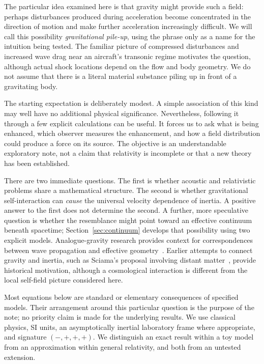 \documentclass[11pt,a4paper]{article}
\numberwithin{equation}{section}
\begin{document}
The particular idea examined here is that gravity might provide such a field: perhaps disturbances produced during acceleration become concentrated in the direction of motion and make further acceleration increasingly difficult. We will call this possibility \emph{gravitational pile-up}, using the phrase only as a name for the intuition being tested. The familiar picture of compressed disturbances and increased wave drag near an aircraft's transonic regime motivates the question, although actual shock locations depend on the flow and body geometry. We do not assume that there is a literal material substance piling up in front of a gravitating body.

The starting expectation is deliberately modest. A simple association of this kind may well have no additional physical significance. Nevertheless, following it through a few explicit calculations can be useful. It forces us to ask what is being enhanced, which observer measures the enhancement, and how a field distribution could produce a force on its source. The objective is an understandable exploratory note, not a claim that relativity is incomplete or that a new theory has been established.

There are two immediate questions. The first is whether acoustic and relativistic problems share a mathematical structure. The second is whether gravitational self-interaction can \emph{cause} the universal velocity dependence of inertia. A positive answer to the first does not determine the second. A further, more speculative question is whether the resemblance might point toward an effective continuum beneath spacetime; Section~\ref{sec:continuum} develops that possibility using two explicit models. Analogue-gravity research provides context for correspondences between wave propagation and effective geometry~\cite{barcelo}. Earlier attempts to connect gravity and inertia, such as Sciama's proposal involving distant matter~\cite{sciama}, provide historical motivation, although a cosmological interaction is different from the local self-field picture considered here.

Most equations below are standard or elementary consequences of specified models. Their arrangement around this particular question is the purpose of the note; no priority claim is made for the underlying results. We use classical physics, SI units, an asymptotically inertial laboratory frame where appropriate, and signature $(-,+,+,+)$. We distinguish an exact result within a toy model from an approximation within general relativity, and both from an untested extension.
\end{document}
